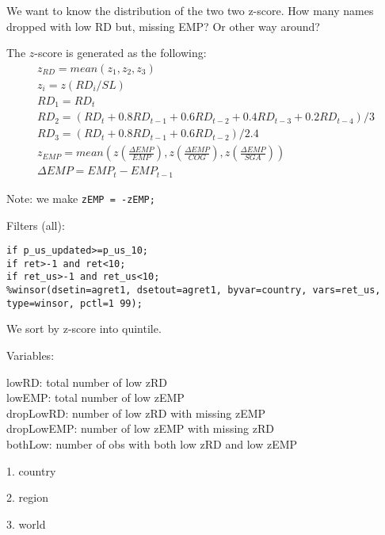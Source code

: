 

\usepackage[T1]{fontenc}




\thispagestyle{fancy}

\newcommand{\code}{\texttt}
\newcommand*{\Commonpath}{20181219/SL}

We want to know the distribution of the two two z-score. How many names dropped with low RD but, missing EMP? Or other way around?

The $z$-score is generated as the following:
$$
\begin{aligned}
& z_{RD} = mean(z_1, z_2, z_3) \\
& z_i = z(RD_i/SL) \\
& RD_1 = RD_t \\
& RD_2 = (RD_t + 0.8RD_{t-1} + 0.6RD_{t-2} + 0.4RD_{t-3} + 0.2RD_{t-4})/3 \\
& RD_3 = (RD_t + 0.8RD_{t-1} + 0.6RD_{t-2})/2.4 
& \\
& z_{EMP} = mean(z(\frac{\Delta EMP}{EMP}), z(\frac{\Delta EMP}{COG}), z(\frac{\Delta EMP}{SGA})) \\
& \Delta EMP = EMP_t - EMP_{t-1}
\end{aligned}
$$

Note: we make \code{zEMP = -zEMP;}

Filters (all):

\code{if p\_us\_updated>=p\_us\_10;} \\
\code{if ret>-1 and ret<10;} \\
\code{if ret\_us>-1 and ret\_us<10;} \\
\code{\%winsor(dsetin=agret1, dsetout=agret1, byvar=country, vars=ret\_us, type=winsor, pctl=1 99);}

We sort by z-score into quintile.

Variables:

lowRD: total number of low zRD \\
lowEMP: total number of low zEMP \\
dropLowRD: number of low zRD with missing zEMP \\
dropLowEMP: number of low zEMP with missing zRD \\
bothLow: number of obs with both low zRD and low zEMP


1. country


2. region


3. world



